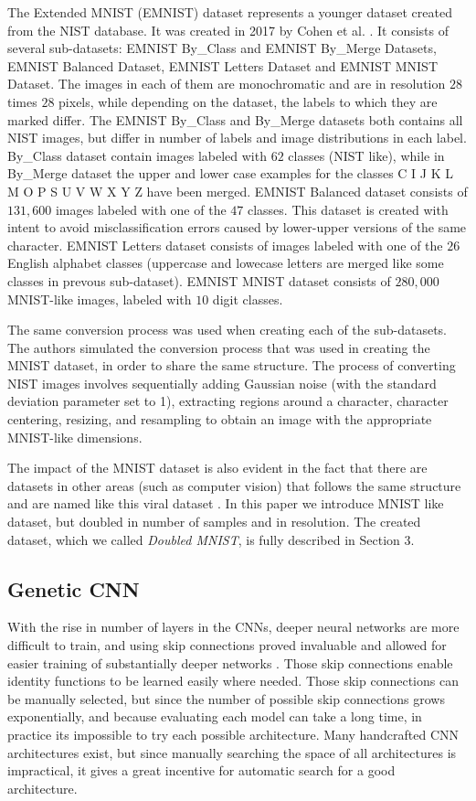 \documentclass[eng]{simposium}
\begin{document}
The Extended MNIST (EMNIST) dataset represents a younger dataset created from the NIST database. 
It was created in 2017 by Cohen et al. \cite{1}. 
It consists of several sub-datasets: EMNIST By\_Class and EMNIST By\_Merge Datasets, EMNIST Balanced Dataset, 
EMNIST Letters Dataset and EMNIST MNIST Dataset. 
The images in each of them are monochromatic and are in resolution $28$ times $28$ pixels, 
while depending on the dataset, the labels to which they are marked differ. 
The EMNIST By\_Class and By\_Merge datasets both contains all NIST images, but differ in number of labels and image distributions 
in each label. By\_Class dataset contain images labeled with $62$ classes (NIST like), while in By\_Merge dataset 
the upper and lower case examples for the classes C I J K L M O P S U V W X Y Z have been merged. 
EMNIST Balanced dataset consists of $131,600$ images labeled with one of the $47$ classes. 
This dataset is created with intent to avoid misclassification errors caused by lower-upper versions of the same character. 
EMNIST Letters dataset consists of images labeled with one of the $26$ English alphabet classes 
(uppercase and lowecase letters are merged like some classes in prevous sub-dataset). 
EMNIST MNIST dataset consists of $280,000$ MNIST-like images, labeled with $10$ digit classes. 

The same conversion process was used when creating each of the sub-datasets. 
The authors simulated the conversion process that was used in creating the MNIST dataset, in order 
to share the same structure. 
The process of converting NIST images involves sequentially adding Gaussian noise (with the standard deviation parameter set to 1), 
extracting regions around a character, character centering, resizing, and resampling to obtain an image with the appropriate MNIST-like dimensions. 

The impact of the MNIST dataset is also evident in the fact that there are datasets in other areas (such as computer vision) that
follows the same structure and are named like this viral dataset \cite{27}. 
In this paper we introduce MNIST like dataset, but doubled in number of samples and in resolution. 
The created dataset, which we called \textit{Doubled MNIST}, is fully described in Section 3. 

\subsection{Genetic CNN}

With the rise in number of layers in the CNNs, deeper neural networks are more difficult to train, and using skip connections proved invaluable and allowed 
for easier training of substantially deeper networks \cite{6}. Those skip connections enable identity functions to be learned easily where needed.
Those skip connections can be manually selected, but since the number of possible skip connections grows exponentially, and because evaluating each model can take a long time, 
in practice its impossible to try each possible architecture.
Many handcrafted CNN architectures exist, but since manually searching the space of all architectures is impractical, it gives a great incentive for automatic search 
for a good architecture.
\end{document}
